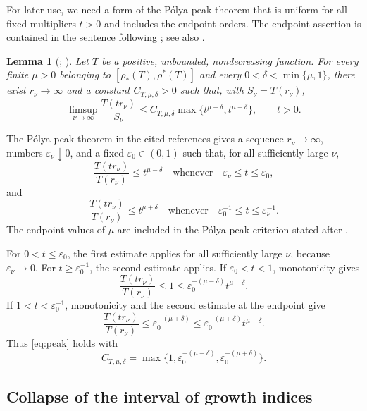 \documentclass[12pt,letterpaper,reqno]{amsart}
\newtheorem{lem}[thm]{Lemma}
\theoremstyle{definition}
\numberwithin{equation}{section}
\begin{document}
For later use, we need a form of the P\'olya-peak theorem that is
uniform for all fixed multipliers \(t>0\) and includes the endpoint
orders. The endpoint assertion is contained in the sentence following
\cite[p.~1203, equations~(16)--(19)]{Ere93}; see also
\cite[Section~2.2, equations~(17)--(19)]{Ere98}.

\begin{lem}[{\cite[p.~1203, equations~(16)--(19)]{Ere93};
\cite[Section~2.2, equations~(17)--(19)]{Ere98}}]
\label{lem:peaks}
Let \(T\) be a positive, unbounded, nondecreasing function. For every
finite \(\mu>0\) belonging to
\([\rho_*(T),\rho^*(T)]\) and every
\(0<\delta<\min\{\mu,1\}\), there exist
\(r_\nu\to\infty\) and a constant \(C_{T,\mu,\delta}>0\) such that,
with \(S_\nu=T(r_\nu)\),
\begin{equation}\label{eq:peak}
 \limsup_{\nu\to\infty}
 \frac{T(tr_\nu)}{S_\nu}
 \leq
 C_{T,\mu,\delta}
 \max\{t^{\mu-\delta},t^{\mu+\delta}\},
 \qquad t>0.
\end{equation}
\end{lem}

The P\'olya-peak theorem in the cited references gives a sequence
\(r_\nu\to\infty\), numbers \(\varepsilon_\nu\downarrow0\), and a fixed
\(\varepsilon_0\in(0,1)\) such that, for all sufficiently large \(\nu\),
\[
 \frac{T(tr_\nu)}{T(r_\nu)}
 \leq t^{\mu-\delta}
 \quad\text{whenever}\quad
 \varepsilon_\nu\leq t\leq\varepsilon_0,
\]
and
\[
 \frac{T(tr_\nu)}{T(r_\nu)}
 \leq t^{\mu+\delta}
 \quad\text{whenever}\quad
 \varepsilon_0^{-1}\leq t\leq\varepsilon_\nu^{-1}.
\]
The endpoint values of \(\mu\) are included in the P\'olya-peak
criterion stated after \cite[(19), p.~1203]{Ere93}.

For \(0<t\leq\varepsilon_0\), the first estimate applies for all
sufficiently large \(\nu\), because \(\varepsilon_\nu\to0\). For
\(t\geq\varepsilon_0^{-1}\), the second estimate applies. If
\(\varepsilon_0<t<1\), monotonicity gives
\[
 \frac{T(tr_\nu)}{T(r_\nu)}\leq1
 \leq
 \varepsilon_0^{-(\mu-\delta)}t^{\mu-\delta}.
\]
If \(1<t<\varepsilon_0^{-1}\), monotonicity and the second estimate at
the endpoint give
\[
 \frac{T(tr_\nu)}{T(r_\nu)}
 \leq
 \varepsilon_0^{-(\mu+\delta)}
 \leq
 \varepsilon_0^{-(\mu+\delta)}t^{\mu+\delta}.
\]
Thus \eqref{eq:peak} holds with
\[
 C_{T,\mu,\delta}
 =
 \max\{1,\varepsilon_0^{-(\mu-\delta)},
           \varepsilon_0^{-(\mu+\delta)}\}.
\]


\subsection{Collapse of the interval of growth indices}
\label{sec:index-collapse}
\end{document}
